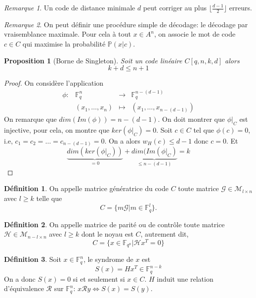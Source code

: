 \documentclass{article}
\newtheorem{proposition}{Proposition}
\theoremstyle{definition}
\newtheorem{definition}{Définition}
\theoremstyle{remark}
\newtheorem{remark}{Remarque}
\begin{document}
\begin{remark}
    Un code de distance minimale $d$ peut corriger au plus $\lfloor \frac{d-1}{2} \rfloor$ erreurs.
\end{remark}

\begin{remark}
    On peut définir une procédure simple de décodage: le décodage par vraisemblance maximale. Pour cela à tout $x \in A^n$, on associe le mot de code $c \in C$ qui maximise la probabilité $\mathbb{P}(x | c)$. 
\end{remark}

\begin{proposition}[Borne de Singleton]
\label{prop1}
    Soit un code linéaire $C[q, n, k, d]$ alors
    \[ k + d \le n + 1 \]
\end{proposition}

\begin{proof}
    On considère l'application
    \[ 
    \begin{array}{cccc}
         \phi: & \mathbb{F}_q^n & \longrightarrow & \mathbb{F}_q^{n-(d-1)}\\
         & (x_1, \dots, x_n) & \longmapsto & (x_1, \dots, x_{n-(d-1)})
    \end{array}
    \]
    On remarque que $dim(Im(\phi)) = n - (d-1)$. On doit montrer que $\phi \vert_{C}$ est injective, pour cela, on montre que $ker(\phi \vert_{C}) = {0}$. Soit $c \in C$ tel que $\phi(c) = 0$, i.e, $c_1 = c_2 = \dots = c_{n-(d-1)} = 0$. On a alors $w_H(c) \le d - 1$ donc $c = 0$. Et
    \[
        \underbrace{dim(ker(\phi \vert_{C}))}_{= 0} + \underbrace{dim(Im(\phi \vert_{C})}_{\le n-(d-1)} = k 
    \]
\end{proof}

\begin{definition}
\label{def5}
    On appelle matrice génératrice du code $C$ toute matrice $\mathcal{G} \in \mathcal{M}_{l \times n}$ avec $l \ge k$ telle que 
    \[ C = \{ m \mathcal{G} | m \in \mathbb{F}_q^l \}. \]
\end{definition}

\begin{definition}
\label{def6}
    On appelle matrice de parité ou de contrôle toute matrice $\mathcal{H} \in \mathcal{M}_{n-l \times n}$ avec $l \ge k$ dont le noyau est $C$, autrement dit,
    \[ C = \{ x \in \mathbb{F}_{q^n} | \mathcal{H}x^T = 0 \} \]
\end{definition}

\begin{definition}
    Soit $x \in \mathbb{F}_q^n$, le syndrome de $x$ est
    \[ S(x) = Hx^T \in \mathbb{F}_q^{n-k} \]
    On a donc $S(x) = 0$ si et seulement si $x \in C$. $H$ induit une relation d'équivalence $\mathcal{R}$  sur $\mathbb{F}_q^n$: $x\mathcal{R}y \Leftrightarrow S(x) = S(y)$.  
\end{definition}
\end{document}
